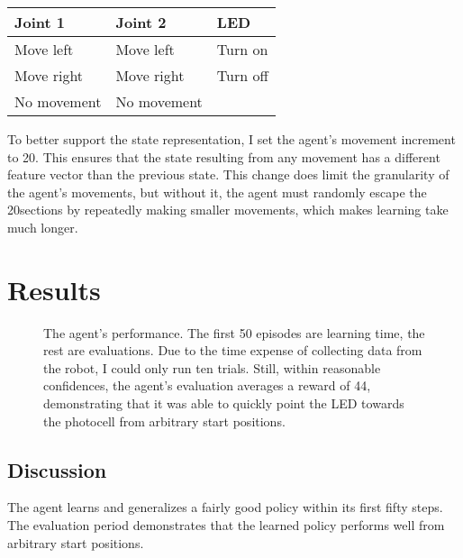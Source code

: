 \documentclass{article}
\begin{document}
\begin{center}
	\begin{tabular}{ l l l}
		Joint 1 & Joint 2 & LED\\ \midrule
		Move left & Move left & Turn on\\
		Move right & Move right & Turn off\\
		No movement & No movement & 
		
	\end{tabular}
\end{center}

To better support the state representation, I set the agent's movement increment to 20\degree. This ensures that the state resulting from any movement has a different feature vector than the previous state. This change does limit the granularity of the agent's movements, but without it, the agent must randomly escape the 20\degree\space sections by repeatedly making smaller movements, which makes learning take much longer. 



\section{Results}


	\begin{figure}[h]
		\begin{center}
			\caption{The agent's performance. The first 50 episodes are learning time, the rest are evaluations. Due to the time expense of collecting data from the robot, I could only run ten trials. Still, within reasonable confidences, the agent's evaluation averages a reward of 44, demonstrating that it was able to quickly point the LED towards the photocell from arbitrary start positions.}
		\end{center}
	\end{figure}
	
\subsection{Discussion}

The agent learns and generalizes a fairly good policy within its first fifty steps. The evaluation period demonstrates that the learned policy performs well from arbitrary start positions. 
\end{document}
